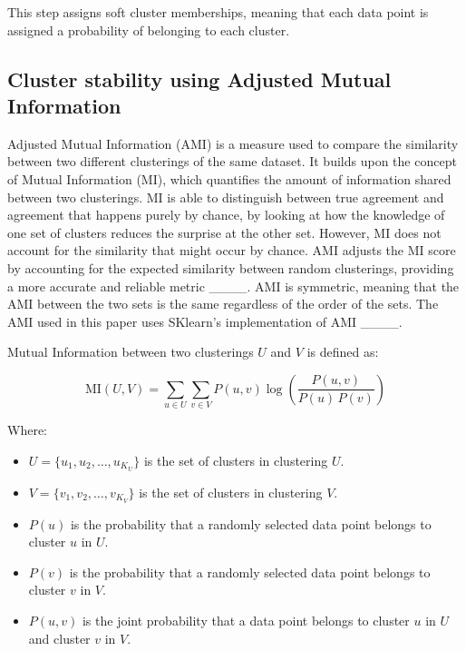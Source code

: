 This step assigns soft cluster memberships, meaning that each data point is assigned a probability of belonging to each cluster.


\subsection*{Cluster stability using  Adjusted Mutual Information}

Adjusted Mutual Information (AMI) is a measure used to compare the similarity between two different clusterings of the same dataset. It builds upon the concept of Mutual Information (MI), which quantifies the amount of information shared between two clusterings. MI is able to distinguish between true agreement and agreement that happens purely by chance, by looking at how the knowledge of one set of clusters reduces the surprise at the other set.
However, MI does not account for the similarity that might occur by chance. AMI adjusts the MI score by accounting for the expected similarity between random clusterings, providing a more accurate and reliable metric ____. 
AMI is symmetric, meaning that the AMI between the two sets is the same regardless of the order of the sets. The AMI used in this paper uses SKlearn's implementation of AMI ____.

Mutual Information between two clusterings \( U \) and \( V \) is defined as:

\[
\text{MI}(U, V) = \sum_{u \in U} \sum_{v \in V} P(u, v) \log \left( \frac{P(u, v)}{P(u) \, P(v)} \right)
\]

Where:
\begin{itemize}
    \item \( U = \{u_1, u_2, \dots, u_{K_U}\} \) is the set of clusters in clustering \( U \).
    \item \( V = \{v_1, v_2, \dots, v_{K_V}\} \) is the set of clusters in clustering \( V \).
    \item \( P(u) \) is the probability that a randomly selected data point belongs to cluster \( u \) in \( U \).
    \item \( P(v) \) is the probability that a randomly selected data point belongs to cluster \( v \) in \( V \).
    \item \( P(u, v) \) is the joint probability that a data point belongs to cluster \( u \) in \( U \) and cluster \( v \) in \( V \).
\end{itemize}



